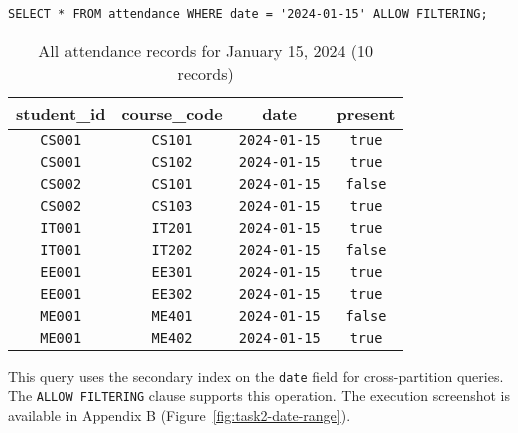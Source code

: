 \begin{verbatim}
SELECT * FROM attendance WHERE date = '2024-01-15' ALLOW FILTERING;
\end{verbatim}

\begin{table}[H]
  \centering
  \footnotesize
  \begin{tabular}{|c|c|c|c|}
    \hline
    \textbf{student\_id} & \textbf{course\_code} & \textbf{date} & \textbf{present} \\
    \hline
    \texttt{CS001}                & \texttt{CS101}                 & \texttt{2024-01-15}    & \texttt{true}             \\
    \texttt{CS001}                & \texttt{CS102}                 & \texttt{2024-01-15}    & \texttt{true}             \\
    \texttt{CS002}                & \texttt{CS101}                 & \texttt{2024-01-15}    & \texttt{false}            \\
    \texttt{CS002}                & \texttt{CS103}                 & \texttt{2024-01-15}    & \texttt{true}             \\
    \texttt{IT001}                & \texttt{IT201}                 & \texttt{2024-01-15}    & \texttt{true}             \\
    \texttt{IT001}                & \texttt{IT202}                 & \texttt{2024-01-15}    & \texttt{false}            \\
    \texttt{EE001}                & \texttt{EE301}                 & \texttt{2024-01-15}    & \texttt{true}             \\
    \texttt{EE001}                & \texttt{EE302}                 & \texttt{2024-01-15}    & \texttt{true}             \\
    \texttt{ME001}                & \texttt{ME401}                 & \texttt{2024-01-15}    & \texttt{false}            \\
    \texttt{ME001}                & \texttt{ME402}                 & \texttt{2024-01-15}    & \texttt{true}             \\
    \hline
  \end{tabular}
  \caption{All attendance records for January 15, 2024 (10 records)}
\end{table}

This query uses the secondary index on the \texttt{date} field for cross-partition queries. The \texttt{ALLOW FILTERING} clause supports this operation. The execution screenshot is available in Appendix B (Figure~\ref{fig:task2-date-range}).

